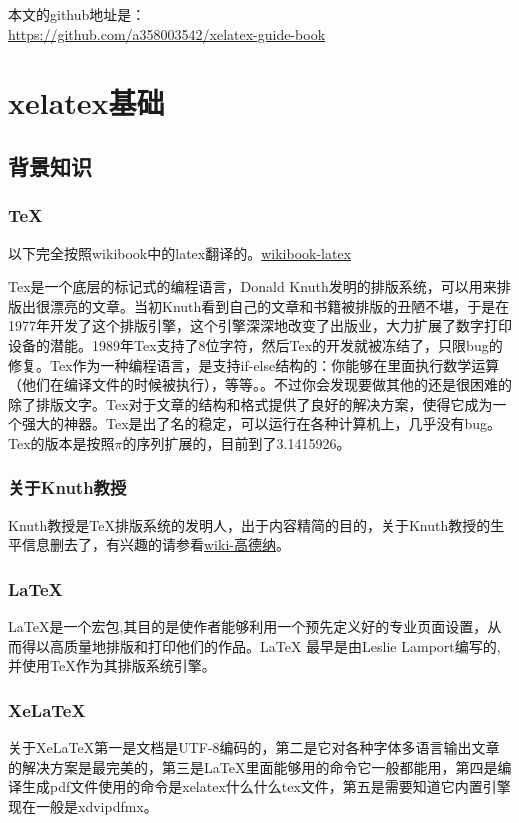 \documentclass[11pt,oneside]{book}
\begin{document}
本文的github地址是：\\
\href{https://github.com/a358003542/xelatex-guide-book}{https://github.com/a358003542/xelatex-guide-book}



\setcounter{tocdepth}{2}    
\tableofcontents


\mainmatter 
\part{xelatex基础}

\chapter{背景知识}
\section{TeX}
以下完全按照wikibook中的latex翻译的。\href{http://en.wikibooks.org/wiki/LaTeX/Introduction}{wikibook-latex}

Tex是一个底层的标记式的编程语言，Donald Knuth发明的排版系统，可以用来排版出很漂亮的文章。当初Knuth看到自己的文章和书籍被排版的丑陋不堪，于是在1977年开发了这个排版引擎，这个引擎深深地改变了出版业，大力扩展了数字打印设备的潜能。1989年Tex支持了8位字符，然后Tex的开发就被冻结了，只限bug的修复。Tex作为一种编程语言，是支持if-else结构的：你能够在里面执行数学运算（他们在编译文件的时候被执行），等等。。不过你会发现要做其他的还是很困难的除了排版文字。Tex对于文章的结构和格式提供了良好的解决方案，使得它成为一个强大的神器。Tex是出了名的稳定，可以运行在各种计算机上，几乎没有bug。Tex的版本是按照$\pi$的序列扩展的，目前到了3.1415926。

\section{关于Knuth教授}
Knuth教授是\TeX 排版系统的发明人，出于内容精简的目的，关于Knuth教授的生平信息删去了，有兴趣的请参看\href{http://zh.wikipedia.org/wiki/%E9%AB%98%E5%BE%B7%E7%BA%B3}{wiki-高德纳}。

\section{LaTeX}
LaTeX是一个宏包,其目的是使作者能够利用一个预先定义好的专业页面设置，从而得以高质量地排版和打印他们的作品。LaTeX 最早是由Leslie Lamport编写的,并使用\TeX 作为其排版系统引擎\cite{lshort}。

\section{XeLaTeX}
关于XeLaTeX第一是文档是UTF-8编码的，第二是它对各种字体多语言输出文章的解决方案是最完美的，第三是LaTeX里面能够用的命令它一般都能用，第四是编译生成pdf文件使用的命令是xelatex什么什么tex文件，第五是需要知道它内置引擎现在一般是xdvipdfmx。
\end{document}
